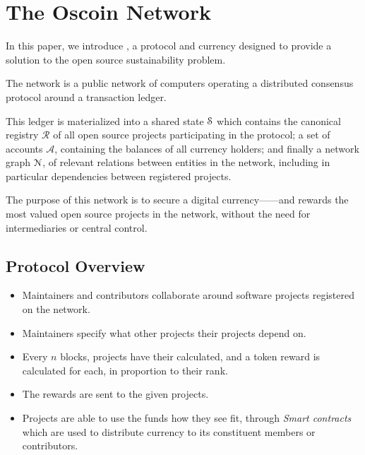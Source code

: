\section{The Oscoin Network}
\label{s:oscoin}



\noindent In this paper, we introduce \oscoin{}, a protocol and currency
designed to provide a solution to the open source sustainability problem.

The \oscoin{} network is a public network of computers operating a distributed
consensus protocol around a transaction ledger.


This ledger is materialized into a shared state $\mathcal{S}$ which
contains the canonical registry $\mathcal{R}$ of all open source
projects participating in the \oscoin{} protocol; a set of accounts
$\mathcal{A}$, containing the balances of all currency holders; and
finally a network graph $\mathcal{N}$, of relevant relations between
entities in the network, including in particular dependencies between
registered projects.

The purpose of this network is to secure a digital currency---\oscoin{}---and
rewards the most valued open source projects in the network, without the need
for intermediaries or central control.

\subsection{Protocol Overview}

\begin{itemize}
    \item Maintainers and contributors collaborate around software projects
        registered on the network.
    \item Maintainers specify what other projects their projects depend on.
    \item Every $n$ blocks, projects have their \osrank{} calculated, and a
        token reward is calculated for each, in proportion to their rank.
    \item The rewards are sent to the given projects.
    \item Projects are able to use the funds how they see fit, through
        \emph{Smart contracts} which are used to distribute currency to its
        constituent members or contributors.
\end{itemize}


